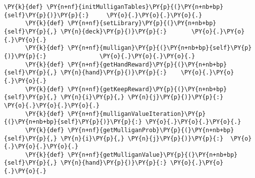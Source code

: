 \begin{Verbatim}[commandchars=\\\{\}]
      \PY{k}{def} \PY{n+nf}{initMulliganTables}\PY{p}{(}\PY{n+nb+bp}{self}\PY{p}{)}\PY{p}{:}     \PY{o}{.}\PY{o}{.}\PY{o}{.}
      \PY{k}{def} \PY{n+nf}{setLibrary}\PY{p}{(}\PY{n+nb+bp}{self}\PY{p}{,} \PY{n}{deck}\PY{p}{)}\PY{p}{:}       \PY{o}{.}\PY{o}{.}\PY{o}{.}
      \PY{k}{def} \PY{n+nf}{mulligan}\PY{p}{(}\PY{n+nb+bp}{self}\PY{p}{)}\PY{p}{:}               \PY{o}{.}\PY{o}{.}\PY{o}{.}
      \PY{k}{def} \PY{n+nf}{getHandReward}\PY{p}{(}\PY{n+nb+bp}{self}\PY{p}{,} \PY{n}{hand}\PY{p}{)}\PY{p}{:}    \PY{o}{.}\PY{o}{.}\PY{o}{.}
      \PY{k}{def} \PY{n+nf}{getKeepReward}\PY{p}{(}\PY{n+nb+bp}{self}\PY{p}{,} \PY{n}{i}\PY{p}{,} \PY{n}{j}\PY{p}{)}\PY{p}{:}    \PY{o}{.}\PY{o}{.}\PY{o}{.}
      \PY{k}{def} \PY{n+nf}{mulliganValueIteration}\PY{p}{(}\PY{n+nb+bp}{self}\PY{p}{)}\PY{p}{:} \PY{o}{.}\PY{o}{.}\PY{o}{.}
      \PY{k}{def} \PY{n+nf}{getMulliganProb}\PY{p}{(}\PY{n+nb+bp}{self}\PY{p}{,} \PY{n}{i}\PY{p}{,} \PY{n}{j}\PY{p}{)}\PY{p}{:}  \PY{o}{.}\PY{o}{.}\PY{o}{.}
      \PY{k}{def} \PY{n+nf}{getMulliganValue}\PY{p}{(}\PY{n+nb+bp}{self}\PY{p}{,} \PY{n}{hand}\PY{p}{)}\PY{p}{:} \PY{o}{.}\PY{o}{.}\PY{o}{.}
\end{Verbatim}
